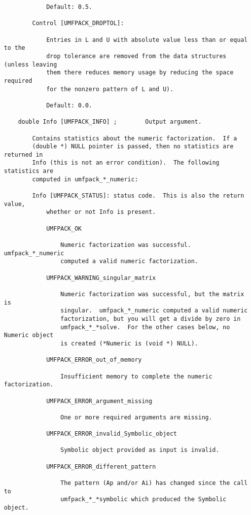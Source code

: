 \documentclass[11pt]{article}
\begin{document}
{\begin{verbatim}
            Default: 0.5.

        Control [UMFPACK_DROPTOL]:

            Entries in L and U with absolute value less than or equal to the
            drop tolerance are removed from the data structures (unless leaving
            them there reduces memory usage by reducing the space required
            for the nonzero pattern of L and U).

            Default: 0.0.

    double Info [UMFPACK_INFO] ;        Output argument.

        Contains statistics about the numeric factorization.  If a
        (double *) NULL pointer is passed, then no statistics are returned in
        Info (this is not an error condition).  The following statistics are
        computed in umfpack_*_numeric:

        Info [UMFPACK_STATUS]: status code.  This is also the return value,
            whether or not Info is present.

            UMFPACK_OK

                Numeric factorization was successful.  umfpack_*_numeric
                computed a valid numeric factorization.

            UMFPACK_WARNING_singular_matrix

                Numeric factorization was successful, but the matrix is
                singular.  umfpack_*_numeric computed a valid numeric
                factorization, but you will get a divide by zero in
                umfpack_*_*solve.  For the other cases below, no Numeric object
                is created (*Numeric is (void *) NULL).

            UMFPACK_ERROR_out_of_memory

                Insufficient memory to complete the numeric factorization.

            UMFPACK_ERROR_argument_missing

                One or more required arguments are missing.

            UMFPACK_ERROR_invalid_Symbolic_object

                Symbolic object provided as input is invalid.

            UMFPACK_ERROR_different_pattern

                The pattern (Ap and/or Ai) has changed since the call to
                umfpack_*_*symbolic which produced the Symbolic object.


\end{verbatim}}
\end{document}
